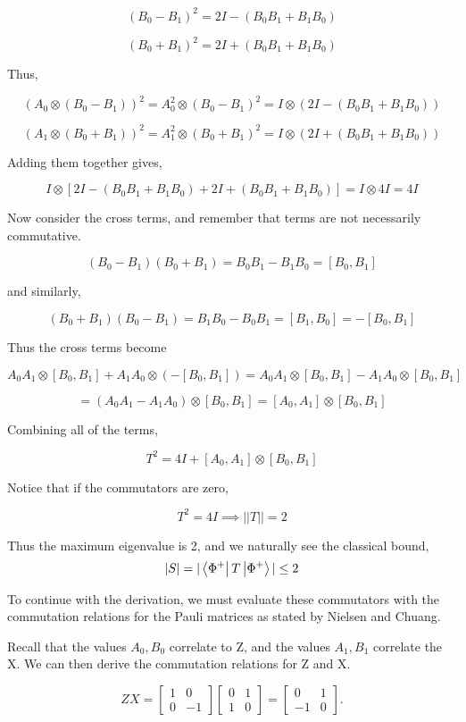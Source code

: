 \documentclass[12pt]{article}
\begin{document}
$$
(B_0 - B_1)^2 = 2I - (B_0B_1 + B_1B_0)
$$

$$
(B_0 + B_1)^2 = 2I + (B_0B_1 + B_1B_0)
$$

Thus,

$$
(A_0 \otimes(B_0 - B_1))^2 = A_0^2 \otimes (B_0 - B_1)^2 = I \otimes (2I - (B_0B_1 + B_1B_0))
$$

$$
(A_1 \otimes(B_0 + B_1))^2 = A_1^2 \otimes (B_0 + B_1)^2 = I \otimes (2I + (B_0B_1 + B_1B_0))
$$

Adding them together gives,

$$
I \otimes [2I - (B_0B_1 + B_1B_0) + 2I + (B_0B_1 + B_1B_0)] = I \otimes 4I = 4I
$$

Now consider the cross terms, and remember that terms are not necessarily commutative.

$$
(B_0 - B_1)(B_0 + B_1) = B_0 B_1 - B_1 B_0 = [B_0, B_1]
$$

and similarly,

$$
(B_0 + B_1)(B_0 - B_1) = B_1 B_0 - B_0 B_1= [B_1, B_0] = -[B_0, B_1]
$$

Thus the cross terms become

$$
A_0 A_1 \otimes [B_0, B_1] + A_1 A_0 \otimes (-[B_0, B_1]) = A_0 A_1 \otimes [B_0, B_1] - A_1 A_0 \otimes [B_0, B_1]
$$

$$
= (A_0 A_1 - A_1 A_0) \otimes [B_0, B_1] = [A_0, A_1] \otimes [B_0, B_1]
$$

Combining all of the terms,

$$
T^2 = 4I + [A_0, A_1] \otimes [B_0, B_1]
$$

Notice that if the commutators are zero, 

\[
T^2 = 4I \implies ||T|| = 2
\]

Thus the maximum eigenvalue is 2, and we naturally see the classical bound, 
\[
|S| = |\bra{\Phi^+}T\ket{\Phi^+}| \leq 2
\]

To continue with the derivation, we must evaluate these commutators with the commutation relations for the Pauli matrices as stated by Nielsen and Chuang\cite{Quantum_Information}.  

Recall that the values $A_0, B_0$ correlate to Z, and the values $A_1, B_1$ correlate the X. We can then derive the commutation relations for Z and X.

$$  
ZX = \begin{bmatrix} 1 & 0 \\ 0 & -1 \end{bmatrix} \begin{bmatrix} 0 & 1 \\ 1 & 0 \end{bmatrix} = \begin{bmatrix} 0 & 1 \\ -1 & 0 \end{bmatrix}.  
$$  
\end{document}
